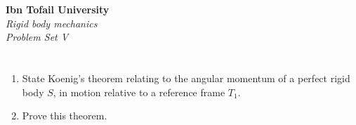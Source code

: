 \documentclass[12pt]{article}
\begin{document}
\begin{center}
\Large\textbf{Ibn Tofail University} \\[1em]
\large\textit{Rigid body mechanics} \\[2em]
\large\textit{Problem Set V} \\[0.5em]
\end{center}

\vspace{1cm}

\section{}

\begin{enumerate}
    \item State Koenig's theorem relating to the angular momentum of a perfect rigid body $S$, in motion relative to a reference frame $T_1$.
    \item Prove this theorem.
\end{enumerate}
\end{document}
